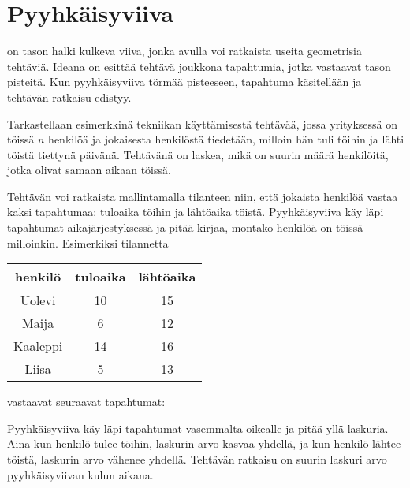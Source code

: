 \chapter{Pyyhkäisyviiva}


 on tason halki kulkeva viiva,
jonka avulla voi ratkaista useita geometrisia tehtäviä.
Ideana on esittää tehtävä joukkona tapahtumia,
jotka vastaavat tason pisteitä.
Kun pyyhkäisyviiva törmää pisteeseen,
tapahtuma käsitellään ja tehtävän ratkaisu edistyy.

Tarkastellaan esimerkkinä tekniikan
käyttämisestä tehtävää,
jossa yrityksessä on töissä $n$ henkilöä
ja jokaisesta henkilöstä tiedetään,
milloin hän tuli töihin ja lähti töistä
tiettynä päivänä.
Tehtävänä on laskea,
mikä on suurin määrä henkilöitä,
jotka olivat samaan aikaan töissä.

Tehtävän voi ratkaista mallintamalla tilanteen
niin, että jokaista henkilöä vastaa kaksi tapahtumaa:
tuloaika töihin ja lähtöaika töistä.
Pyyhkäisyviiva käy läpi tapahtumat aikajärjestyksessä
ja pitää kirjaa, montako henkilöä on töissä milloinkin.
Esimerkiksi tilannetta
\begin{center}
\begin{tabular}{ccc}
henkilö & tuloaika & lähtöaika \\
\hline
Uolevi & 10 & 15 \\
Maija & 6 & 12 \\
Kaaleppi & 14 & 16 \\
Liisa & 5 & 13 \\
\end{tabular}
\end{center}
vastaavat seuraavat tapahtumat:
\begin{center}
\end{center}
Pyyhkäisyviiva käy läpi tapahtumat vasemmalta oikealle
ja pitää yllä laskuria.
Aina kun henkilö tulee töihin, laskurin arvo
kasvaa yhdellä, ja kun henkilö lähtee töistä,
laskurin arvo vähenee yhdellä.
Tehtävän ratkaisu on suurin laskuri arvo
pyyhkäisyviivan kulun aikana.

